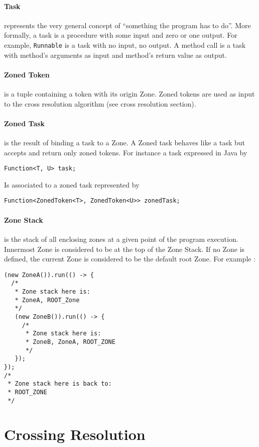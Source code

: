 \paragraph{Task} represents the very general concept of ``something the program has to do''. More formally, a task is a procedure with some input and zero or one output. For example, \lstinline{Runnable} is a task with no input, no output. A method call is a task with method's arguments as input and method's return value as output.

\paragraph{Zoned Token} is a tuple containing a token with its origin Zone. Zoned tokens are used as input to the cross resolution algorithm (see cross resolution section).

\paragraph{Zoned Task} is the result of binding a task to a Zone. A Zoned task behaves like a task but accepts and return only zoned tokens. For instance a task expressed in Java by
\begin{lstlisting}
Function<T, U> task;
\end{lstlisting}
Is associated to a zoned task represented by
\begin{lstlisting}
Function<ZonedToken<T>, ZonedToken<U>> zonedTask;
\end{lstlisting}

\paragraph{Zone Stack} is the stack of all enclosing zones at a given point of the program execution. Innermost Zone is considered to be at the top of the Zone Stack. If no Zone is defined, the current Zone is considered to be the default root Zone. For example :

\begin{lstlisting}
(new ZoneA()).run(() -> {
  /*
   * Zone stack here is:
   * ZoneA, ROOT_Zone
   */
   (new ZoneB()).run(() -> {
     /*
      * Zone stack here is:
      * ZoneB, ZoneA, ROOT_ZONE
      */
   });
});
/*
 * Zone stack here is back to:
 * ROOT_ZONE
 */
\end{lstlisting}

\section{Crossing Resolution}
\label{sec:cross-res}

